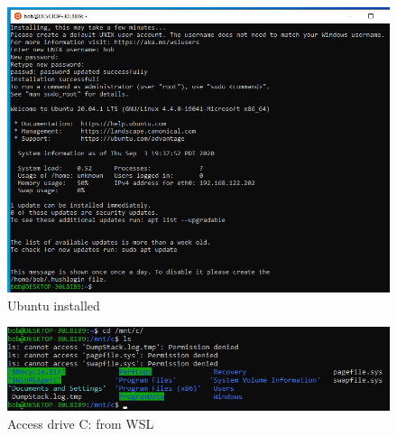 \documentclass[letter,11pt]{article}
\begin{document}
\begin{figure}
    \centering
    \includegraphics[scale=0.64]{Images/WSL/d.png}
    \caption{Ubuntu installed}
    \label{fig:wslinstallcomplete}
\end{figure}

\begin{figure}
    \centering
    \includegraphics[scale=0.64]{Images/WSL/e.png}
    \caption{Access drive C: from WSL}
    \label{fig:wsldrivec}
\end{figure}

\FloatBarrier
\end{document}
